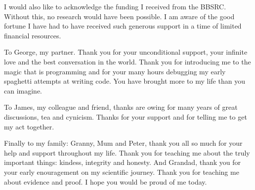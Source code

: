 I would also like to acknowledge the funding I received from the BBSRC. Without this, no research would have been possible. I am aware of the good fortune I have had to have received such generous support in a time of limited financial resources.

To George, my partner. Thank you for your unconditional support, your infinite love and the best conversation in the world. Thank you for introducing me to the magic that is programming and for your many hours debugging my early spaghetti attempts at writing code. You have brought more to my life than you can imagine.

To James, my colleague and friend, thanks are owing for many years of great discussions, tea and cynicism. Thanks for your support and for telling me to get my act together.

Finally to my family: Granny, Mum and Peter, thank you all so much for your help and support throughout my life. Thank you for teaching me about the truly important things: kindess, integrity and honesty. And Grandad, thank you for your early enouragement on my scientific journey. Thank you for teaching me about evidence and proof. I hope you would be proud of me today. 